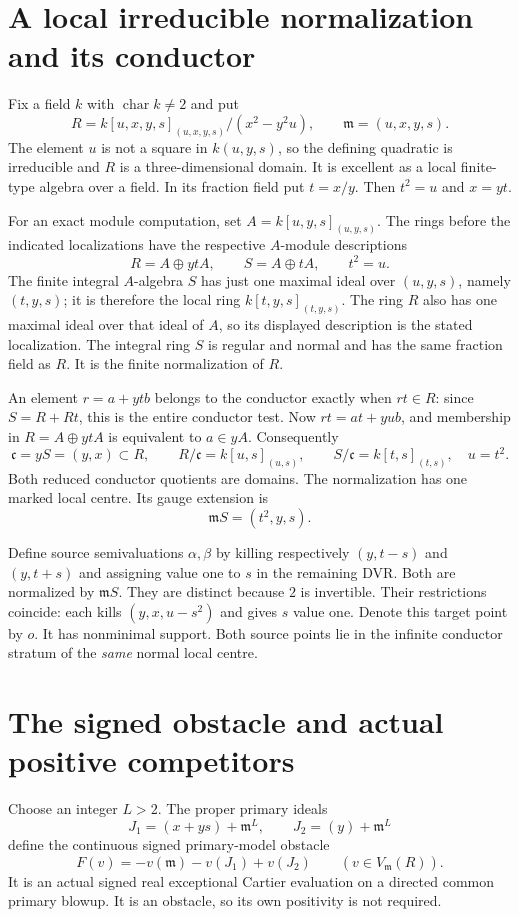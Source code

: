 \documentclass[11pt]{article}
\newcommand{\m}{\mathfrak m}
\begin{document}
\section{A local irreducible normalization and its conductor}
Fix a field $k$ with $\operatorname{char}k\ne2$ and put
\[
 R=k[u,x,y,s]_{(u,x,y,s)}/(x^2-y^2u),\qquad
 \m=(u,x,y,s).
\]
The element $u$ is not a square in $k(u,y,s)$, so the defining quadratic
is irreducible and $R$ is a three-dimensional domain. It is excellent
as a local finite-type algebra over a field. In its fraction field put
$t=x/y$. Then $t^2=u$ and $x=yt$.

For an exact module computation, set
$A=k[u,y,s]_{(u,y,s)}$. The rings before the indicated localizations have
the respective $A$-module descriptions
\[
 R=A\oplus ytA,\qquad S=A\oplus tA,\qquad t^2=u.
\]
The finite integral $A$-algebra $S$ has just one maximal ideal over
$(u,y,s)$, namely $(t,y,s)$; it is therefore the local ring
$k[t,y,s]_{(t,y,s)}$. The ring $R$ also has one maximal ideal over that
ideal of $A$, so its displayed description is the stated localization.
The integral ring $S$ is regular and normal and has the same fraction
field as $R$. It is the finite normalization of $R$.

An element $r=a+ytb$ belongs to the conductor exactly when $rt\in R$:
since $S=R+Rt$, this is the entire conductor test. Now
$rt=at+yub$, and membership in $R=A\oplus ytA$ is equivalent to
$a\in yA$. Consequently
\[
 \mathfrak c=yS=(y,x)\subset R,\qquad
 R/\mathfrak c=k[u,s]_{(u,s)},\qquad
 S/\mathfrak c=k[t,s]_{(t,s)},\quad u=t^2.
\]
Both reduced conductor quotients are domains. The normalization has one
marked local centre. Its gauge extension is
\[
 \m S=(t^2,y,s).
\]

Define source semivaluations $\alpha,\beta$ by killing respectively
$(y,t-s)$ and $(y,t+s)$ and assigning value one to $s$ in the remaining
DVR. Both are normalized by $\m S$. They are distinct because $2$ is
invertible. Their restrictions coincide: each kills
$(y,x,u-s^2)$ and gives $s$ value one. Denote this target point by $o$.
It has nonminimal support. Both source points lie in the infinite
conductor stratum of the \emph{same} normal local centre.

\section{The signed obstacle and actual positive competitors}
Choose an integer $L>2$. The proper primary ideals
\[
 J_1=(x+ys)+\m^L,\qquad J_2=(y)+\m^L
\]
define the continuous signed primary-model obstacle
\begin{equation}\label{eq:F}
 F(v)=-v(\m)-v(J_1)+v(J_2)\qquad(v\in V_{\m}(R)).
\end{equation}
It is an actual signed real exceptional Cartier evaluation on a directed
common primary blowup. It is an obstacle, so its own positivity is not
required.
\end{document}
